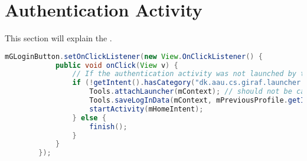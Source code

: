 \section{Authentication Activity}
This section will explain the .

\begin{lstlisting}[style=sourceCode, language=JAVA, caption=This is code, label=lst:authenticationAcitivity] 
mGLoginButton.setOnClickListener(new View.OnClickListener() {
			public void onClick(View v) {
				// If the authentication activity was not launched by the launcher...
				if (!getIntent().hasCategory("dk.aau.cs.giraf.launcher.GIRAF")) {
					Tools.attachLauncher(mContext); // should not be called
					Tools.saveLogInData(mContext, mPreviousProfile.getId());
					startActivity(mHomeIntent);
				} else {
					finish();
				}
			}
		});
\end{lstlisting}